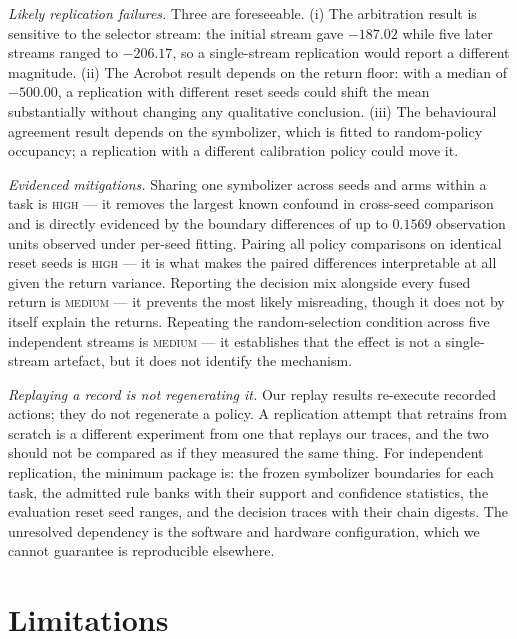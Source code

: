 \documentclass[11pt,a4paper]{article}
\begin{document}
\emph{Likely replication failures.} Three are foreseeable. (i) The arbitration result is sensitive to the selector stream: the initial stream gave $-187.02$ while five later streams ranged to $-206.17$, so a single-stream replication would report a different magnitude. (ii) The Acrobot result depends on the return floor: with a median of $-500.00$, a replication with different reset seeds could shift the mean substantially without changing any qualitative conclusion. (iii) The behavioural agreement result depends on the symbolizer, which is fitted to random-policy occupancy; a replication with a different calibration policy could move it.

\emph{Evidenced mitigations.} Sharing one symbolizer across seeds and arms within a task is \textsc{high} --- it removes the largest known confound in cross-seed comparison and is directly evidenced by the boundary differences of up to $0.1569$ observation units observed under per-seed fitting. Pairing all policy comparisons on identical reset seeds is \textsc{high} --- it is what makes the paired differences interpretable at all given the return variance. Reporting the decision mix alongside every fused return is \textsc{medium} --- it prevents the most likely misreading, though it does not by itself explain the returns. Repeating the random-selection condition across five independent streams is \textsc{medium} --- it establishes that the effect is not a single-stream artefact, but it does not identify the mechanism.

\emph{Replaying a record is not regenerating it.} Our replay results re-execute recorded actions; they do not regenerate a policy. A replication attempt that retrains from scratch is a different experiment from one that replays our traces, and the two should not be compared as if they measured the same thing. For independent replication, the minimum package is: the frozen symbolizer boundaries for each task, the admitted rule banks with their support and confidence statistics, the evaluation reset seed ranges, and the decision traces with their chain digests. The unresolved dependency is the software and hardware configuration, which we cannot guarantee is reproducible elsewhere.

\section{Limitations}
\label{sec:limits}
\end{document}
